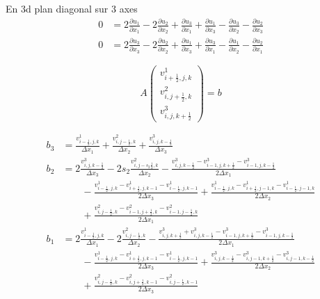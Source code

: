 \begin{frame}[shrink]{En 3d plan diagonal sur 3 axes}
\begin{align*}
	0&=2\frac{\partial u_{1}}{\partial x_{1}}-2\frac{\partial u_{2}}{\partial x_{2}}+\frac{\partial u_{3}}{\partial x_{1}}+\frac{\partial u_{1}}{\partial x_{3}}-\frac{\partial u_{3}}{\partial x_{2}}-\frac{\partial u_{2}}{\partial x_{3}}\\
	0&=2\frac{\partial u_{3}}{\partial x_{3}}-2\frac{\partial u_{2}}{\partial x_{2}}+\frac{\partial u_{1}}{\partial x_{3}}+	\frac{\partial u_{3}}{\partial x_{1}}-\frac{\partial u_{1}}{\partial x_{2}}-\frac{\partial u_{2}}{\partial x_{1}}
\end{align*}

\begin{equation*}
 A\begin{pmatrix}
   v^{1}_{i+\frac{1}{2},j,k}\\
   v^2_{i,j+\frac{1}{2},k}\\
   v^{3}_{i,j,k+\frac{1}{2}}
  \end{pmatrix}=b
\end{equation*}

\begin{align*}
 b_3&=\frac{v^{1}_{i-\frac{1}{2},j,k}}{\Delta x_1}+\frac{v^{2}_{i,j-\frac{1}{2},k}}{\Delta x_2}+\frac{v^{3}_{i,j,k-\frac{1}{2}}}{\Delta x_3}\\
 b_2&=2\frac{v^{3}_{i,j,k-\frac{1}{2}}}{\Delta x_3}-2s_2\frac{v^{2}_{i,j-s_2\frac{1}{2},k}}{\Delta x_2}
	-\frac{v^{3}_{i,j,k-\frac{1}{2}}-v^{3}_{i-1,j,k+\frac{1}{2}}-v^{3}_{i-1,j,k-\frac{1}{2}}}{2\Delta x_1}\\
	&\qquad -\frac{v^1_{i-\frac{1}{2},j,k}-v^{1}_{i+\frac{1}{2},j,k-1}-v^{1}_{i-\frac{1}{2},j,k-1}}{2\Delta x_3}
	+\frac{v^{1}_{i-\frac{1}{2},j,k}-v^{1}_{i+\frac{1}{2},j-1,k}-v^{1}_{i-\frac{1}{2},j-1,k}}{2\Delta x_2}\\
	&\qquad +\frac{v^2_{i,j-\frac{1}{2},k}-v^{2}_{i-1,j+\frac{1}{2},k}-v^{2}_{i-1,j-\frac{1}{2},k}}{2\Delta x_1}\\
	b_1&=2\frac{v^{1}_{i-\frac{1}{2},j,k}}{\Delta x_1}-2\frac{v^{2}_{i,j-\frac{1}{2},k}}{\Delta x_2}
	-\frac{v^{3}_{i,j,k+\frac{1}{2}}+v^{3}_{i,j,k-\frac{1}{2}}-v^{3}_{i-1,j,k+\frac{1}{2}}-v^{3}_{i-1,j,k-\frac{1}{2}}}{2\Delta x_1}\\
	&\qquad -\frac{v^1_{i-\frac{1}{2},j,k}-v^{1}_{i+\frac{1}{2},j,k-1}-v^{1}_{i-\frac{1}{2},j,k-1}}{2\Delta x_3}
	+\frac{v^{3}_{i,j,k-\frac{1}{2}}-v^{3}_{i,j-1,k+\frac{1}{2}}-v^{3}_{i,j-1,k-\frac{1}{2}}}{2\Delta x_2}\\
	&\qquad +\frac{v^2_{i,j-\frac{1}{2},k}-v^{2}_{i,j+\frac{1}{2},k-1}-v^{2}_{i,j-\frac{1}{2},k-1}}{2\Delta x_3}
\end{align*}


\end{frame}
